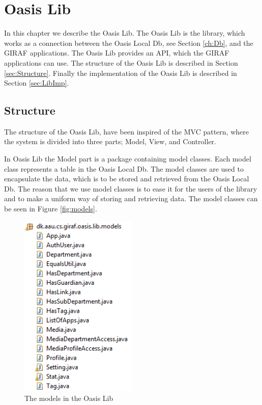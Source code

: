 \chapter{Oasis Lib}
\label{ch:Lib}
In this chapter we describe the Oasis Lib.
The Oasis Lib is the library, which works as a connection between the Oasis Local Db, see Section \vref{ch:Db}, and the GIRAF applications.
The Oasis Lib provides an API, which the GIRAF applications can use.
The structure of the Oasis Lib is described in Section \vref{sec:Structure}.
Finally the implementation of the Oasis Lib is described in Section \vref{sec:LibImp}.

\section{Structure}
\label{sec:Structure}
The structure of the Oasis Lib, have been inspired of the MVC pattern, where the system is divided into three parts; Model, View, and Controller. 

In Oasis Lib the Model part is a package containing model classes. Each model class represents a table in the Oasis Local Db.
The model classes are used to encapsulate the data, which is to be stored and retrieved from the Oasis Local Db.
The reason that we use model classes is to ease it for the users of the library and to make a uniform way of storing and retrieving data.
The model classes can be seen in Figure \vref{fig:models}.
\begin{figure}[htbp]
	\centering
		\includegraphics[width=0.5\textwidth]{images/models.png}
	\caption{The models in the Oasis Lib}
	\label{fig:models}
\end{figure}

